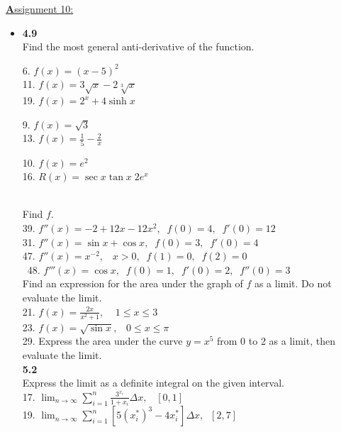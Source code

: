 \documentclass{letter}
\begin{document}
	\clearpage
	\large\underline{\textbf Assignment 10:}
	\begin{itemize}
		\item[] \textbf{4.9}\\
		
		Find the most general anti-derivative of the function.\\
		\begin{minipage}[t]{0.3\textwidth}
			6. $f(x) = (x-5)^2$\\
			11. $f(x) = 3\sqrt x - 2\sqrt[3] x$\\
			19. $f(x) = 2^x + 4 \sinh x$\\
		\end{minipage}
		\begin{minipage}[t]{0.3\textwidth}
			9. $f(x) = \sqrt{3}$\\
			13. $f(x) = \frac15 - \frac2x$\\
		\end{minipage}
		\begin{minipage}[t]{0.3\textwidth}
			10. $f(x) = e^2$\\
			16. $R(x) = \sec x \tan x\; 2e^x$
		\end{minipage}\\
		
		Find $f$.\\
		39. $f''(x) = -2 + 12x - 12x^2, \;\; f(0) = 4,\;\; f'(0) = 12$\\
		31. $f''(x) = \sin x + \cos x, \;\; f(0) = 3, \;\;f'(0) = 4$\\
		47. $f''(x) = x^{-2},\;\;\; x>0,\;\;f(1) = 0,\;\;f(2) = 0$\\\
		48. $f'''(x) = \cos x, \;\; f(0) = 1,\;\; f'(0) = 2,\;\;f''(0) = 3$\\
		
		Find an expression for the area under the graph of $f$ as a limit. Do not evaluate the limit.\\
		21. $f(x) = \frac{2x}{x^2+1},\;\;\;\;1 \leq x \leq 3$\\
		23. $f(x) = \sqrt{\sin x}, \;\;\;0 \leq x \leq \pi$\\
		
		29. Express the area under the curve $y=x^5$ from 0 to 2 as a limit, then evaluate the limit.\\
		
		\textbf{5.2}\\
		
		Express the limit as a definite integral on the given interval.\\
		17. $\displaystyle \lim_{n \to \infty} \sum_{i=1}^n \frac{3^{x_i}}{1+x_i} \Delta x,\;\;\; \left[ 0, 1\right]$\\
		19. $\displaystyle \lim_{n \to \infty} \sum_{i=1}^n \left[ 5(x_i^*)^3 - 4x_i^*\right] \Delta x,\;\; \left[ 2, 7\right]$\\
		

\end{itemize}
\end{document}
